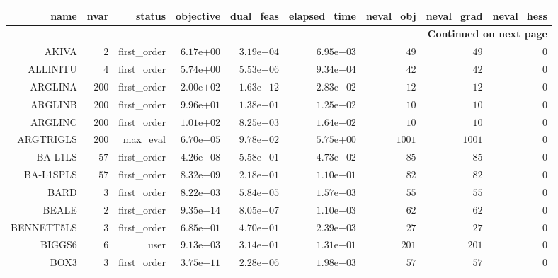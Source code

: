 \begin{longtable}{rrrrrrrrr}
\hline
name & nvar & status & objective & dual\_feas & elapsed\_time & neval\_obj & neval\_grad & neval\_hess \\\hline
\endhead
\hline
\multicolumn{9}{r}{{\bfseries Continued on next page}}\\
\hline
\endfoot
\endlastfoot
AKIVA & \(     2\) & first\_order & \( 6.17\)e\(+00\) & \( 3.19\)e\(-04\) & \( 6.95\)e\(-03\) & \(    49\) & \(    49\) & \(     0\) \\
ALLINITU & \(     4\) & first\_order & \( 5.74\)e\(+00\) & \( 5.53\)e\(-06\) & \( 9.34\)e\(-04\) & \(    42\) & \(    42\) & \(     0\) \\
ARGLINA & \(   200\) & first\_order & \( 2.00\)e\(+02\) & \( 1.63\)e\(-12\) & \( 2.83\)e\(-02\) & \(    12\) & \(    12\) & \(     0\) \\
ARGLINB & \(   200\) & first\_order & \( 9.96\)e\(+01\) & \( 1.38\)e\(-01\) & \( 1.25\)e\(-02\) & \(    10\) & \(    10\) & \(     0\) \\
ARGLINC & \(   200\) & first\_order & \( 1.01\)e\(+02\) & \( 8.25\)e\(-03\) & \( 1.64\)e\(-02\) & \(    10\) & \(    10\) & \(     0\) \\
ARGTRIGLS & \(   200\) & max\_eval & \( 6.70\)e\(-05\) & \( 9.78\)e\(-02\) & \( 5.75\)e\(+00\) & \(  1001\) & \(  1001\) & \(     0\) \\
BA-L1LS & \(    57\) & first\_order & \( 4.26\)e\(-08\) & \( 5.58\)e\(-01\) & \( 4.73\)e\(-02\) & \(    85\) & \(    85\) & \(     0\) \\
BA-L1SPLS & \(    57\) & first\_order & \( 8.32\)e\(-09\) & \( 2.18\)e\(-01\) & \( 1.10\)e\(-01\) & \(    82\) & \(    82\) & \(     0\) \\
BARD & \(     3\) & first\_order & \( 8.22\)e\(-03\) & \( 5.84\)e\(-05\) & \( 1.57\)e\(-03\) & \(    55\) & \(    55\) & \(     0\) \\
BEALE & \(     2\) & first\_order & \( 9.35\)e\(-14\) & \( 8.05\)e\(-07\) & \( 1.10\)e\(-03\) & \(    62\) & \(    62\) & \(     0\) \\
BENNETT5LS & \(     3\) & first\_order & \( 6.85\)e\(-01\) & \( 4.70\)e\(-01\) & \( 2.39\)e\(-03\) & \(    27\) & \(    27\) & \(     0\) \\
BIGGS6 & \(     6\) & user & \( 9.13\)e\(-03\) & \( 3.14\)e\(-01\) & \( 1.31\)e\(-01\) & \(   201\) & \(   201\) & \(     0\) \\
BOX3 & \(     3\) & first\_order & \( 3.75\)e\(-11\) & \( 2.28\)e\(-06\) & \( 1.98\)e\(-03\) & \(    57\) & \(    57\) & \(     0\) \\

\end{longtable}
